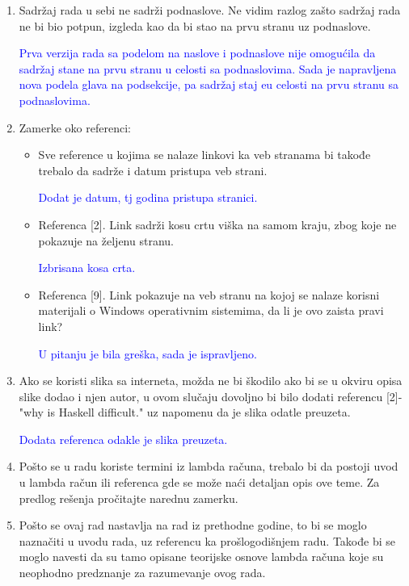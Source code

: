 \documentclass[a4paper]{report}
\newcommand{\odgovor}[1]{\textcolor{blue}{#1}}
\begin{document}
\begin{enumerate}
		
		\item Sadržaj rada u sebi ne sadrži podnaslove. Ne vidim razlog zašto sadržaj rada ne bi bio potpun, izgleda kao da bi stao na prvu stranu uz podnaslove.
		
		\odgovor{Prva verzija rada sa podelom na naslove i podnaslove nije omogućila da sadržaj stane na prvu stranu u celosti sa podnaslovima. Sada je napravljena nova podela glava na podsekcije, pa sadržaj staj eu celosti na prvu stranu sa podnaslovima.}
		
		\item Zamerke oko referenci:
		\begin{itemize}
			\item Sve reference u kojima se nalaze linkovi ka veb stranama bi takođe trebalo da sadrže i datum pristupa veb strani.
			
			\odgovor{Dodat je datum, tj godina pristupa stranici.}
			
			\item Referenca [2]. Link sadrži kosu crtu viška na samom kraju, zbog koje ne pokazuje na željenu stranu.
			
			\odgovor{Izbrisana kosa crta.}
			
			\item Referenca [9]. Link pokazuje na veb stranu na kojoj se nalaze korisni materijali o Windows operativnim sistemima, da li je ovo zaista pravi link?
			
			\odgovor{U pitanju je bila greška, sada je ispravljeno.}
			
		\end{itemize}
		\item Ako se koristi slika sa interneta, možda ne bi škodilo ako bi se u okviru opisa slike dodao i njen autor, u ovom slučaju dovoljno bi bilo dodati referencu [2]-"why is Haskell difficult." uz napomenu da je slika odatle preuzeta.
		
		\odgovor{Dodata referenca odakle je slika preuzeta.}
		
		\item Pošto se u radu koriste termini iz lambda računa, trebalo bi da postoji uvod u lambda račun ili referenca gde se može naći detaljan opis ove teme. Za predlog rešenja pročitajte narednu zamerku.
		
		\item Pošto se ovaj rad nastavlja na rad iz prethodne godine, to bi se moglo naznačiti u uvodu rada, uz referencu ka prošlogodišnjem radu. Takođe bi se moglo navesti da su tamo opisane teorijske osnove lambda računa koje su neophodno predznanje za razumevanje ovog rada.
		

\end{enumerate}
\end{document}
